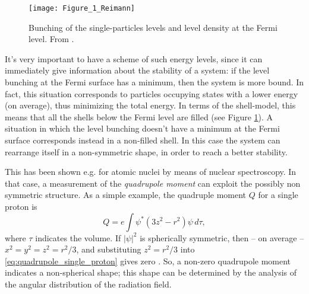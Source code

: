 \begin{figure}[h]%
	\centering
    \texttt{[image: Figure\_1\_Reimann]}
    \caption{Bunching of the single-particles levels and level density at the Fermi level. From \cite{Brack1972}.}
	\label{fig:Figure_1_Reimann}
\end{figure}

It's very important to have a scheme of such energy levels, since it can immediately give information about the stability of a system: if the level bunching at the Fermi surface has a minimum, then the system is more bound. In fact, this situation corresponds to particles occupying states with a lower energy (on average), thus minimizing the total energy. In terms of the shell-model, this means that all the shells below the Fermi level are filled (see Figure \ref{fig:Figure_1_Reimann}). A situation in which the level bunching doesn't have a minimum at the Fermi surface corresponds instead in a non-filled shell. In this case the system can rearrange itself in a non-symmetric shape, in order to reach a better stability.

This has been shown e.g. for atomic nuclei by means of nuclear spectroscopy. In that case, a measurement of the \emph{quadrupole moment} can exploit the possibly non symmetric structure. As a simple example, the quadruple moment $Q$ for a single proton is
\begin{equation}
	Q = e \int \psi^*(3z^2-r^2)\psi\,d\tau,
	\label{eq:quadrupole_single_proton}
\end{equation}
where $\tau$ indicates the volume. If $|\psi|^2$ is spherically symmetric, then -- on average -- $x^2=y^2=z^2=r^2/3$, and substituting $z^2=r^2/3$ into \eqref{eq:quadrupole_single_proton} gives zero \citep[see][]{Krane1988}. So, a non-zero quadrupole moment indicates a non-spherical shape; this shape can be determined by the analysis of the angular distribution of the radiation field.

